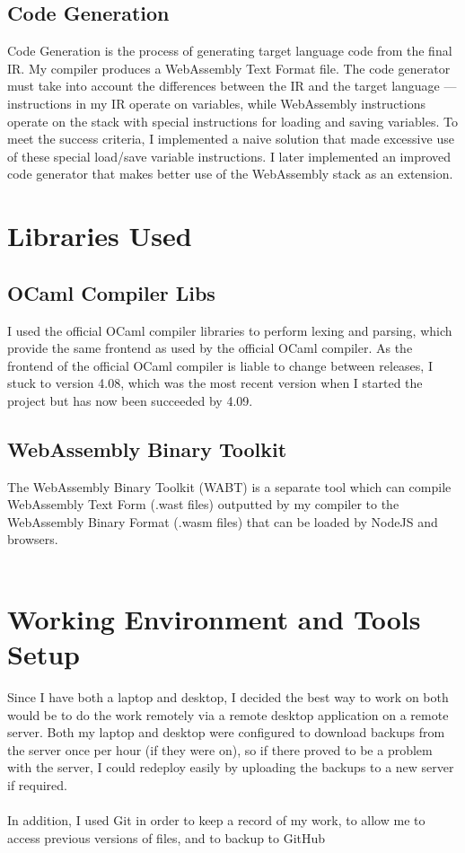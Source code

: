 \subsection{Code Generation}
Code Generation is the process of generating target language code from the final IR. My compiler produces a WebAssembly Text Format file. The code generator must take into account the differences between the IR and the target language --- instructions in my IR operate on variables, while WebAssembly instructions operate on the stack with special instructions for loading and saving variables. To meet the success criteria, I implemented a naive solution that made excessive use of these special load/save variable instructions. I later implemented an improved code generator that makes better use of the WebAssembly stack as an extension.

\section{Libraries Used}
\subsection{OCaml Compiler Libs}
I used the official OCaml compiler \cite{OCaml} libraries to perform lexing and parsing, which provide the same frontend as used by the official OCaml compiler. As the frontend of the official OCaml compiler is liable to change between releases, I stuck to version 4.08, which was the most recent version when I started the project but has now been succeeded by 4.09.

\subsection{WebAssembly Binary Toolkit}
The WebAssembly Binary Toolkit \cite{Wabt} (WABT)  is a separate tool which can compile WebAssembly Text Form (.wast files) outputted by my compiler to the WebAssembly Binary Format (.wasm files) that can be loaded by NodeJS and browsers.
\\\\


\section{Working Environment and Tools Setup}
Since I have both a laptop and desktop, I decided the best way to work on both would be to do the work remotely via a remote desktop application on a remote server. Both my laptop and desktop were configured to download backups from the server once per hour (if they were on), so if there proved to be a problem with the server, I could redeploy easily by uploading the backups to a new server if required.
\\\\
In addition, I used Git in order to keep a record of my work, to allow me to access previous versions of files, and to backup to GitHub

